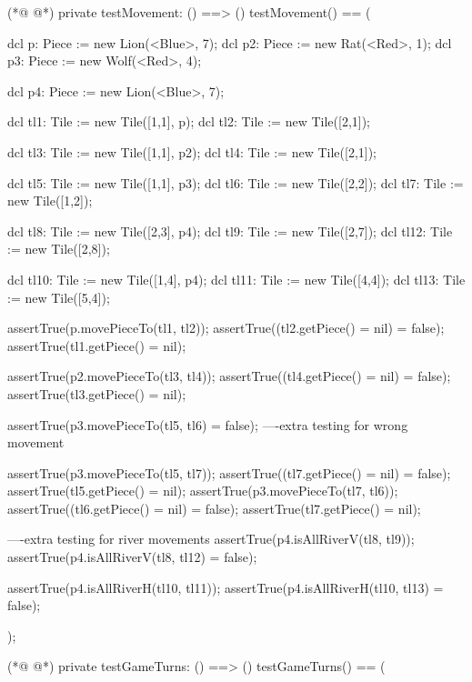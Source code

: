 \begin{vdmpp}[breaklines=true]
(*@
\label{testMovement:236}
@*)
            private testMovement: () ==> ()
         testMovement() ==
         (
         
         dcl p: Piece := new Lion(<Blue>, 7);
         dcl p2: Piece := new Rat(<Red>, 1);
         dcl p3: Piece := new Wolf(<Red>, 4);

        dcl p4: Piece := new Lion(<Blue>, 7);
         
         
         dcl tl1: Tile := new Tile([1,1], p);
         dcl tl2: Tile := new Tile([2,1]);
         
         dcl tl3: Tile := new Tile([1,1], p2);
         dcl tl4: Tile := new Tile([2,1]);
         
         dcl tl5: Tile := new Tile([1,1], p3);
         dcl tl6: Tile := new Tile([2,2]);
         dcl tl7: Tile := new Tile([1,2]);
         
         dcl tl8: Tile := new Tile([2,3], p4);
         dcl tl9: Tile := new Tile([2,7]);
         dcl tl12: Tile := new Tile([2,8]);
         
         dcl tl10: Tile := new Tile([1,4], p4);
         dcl tl11: Tile := new Tile([4,4]);
         dcl tl13: Tile := new Tile([5,4]);
         
         assertTrue(p.movePieceTo(tl1, tl2));
         assertTrue((tl2.getPiece() = nil) = false);
         assertTrue(tl1.getPiece() = nil);
         
         assertTrue(p2.movePieceTo(tl3, tl4));
         assertTrue((tl4.getPiece() = nil) = false);
         assertTrue(tl3.getPiece() = nil);
         
         assertTrue(p3.movePieceTo(tl5, tl6) = false); ----extra testing for wrong movement
         
         assertTrue(p3.movePieceTo(tl5, tl7));
         assertTrue((tl7.getPiece() = nil) = false);
         assertTrue(tl5.getPiece() = nil);
         assertTrue(p3.movePieceTo(tl7, tl6));
         assertTrue((tl6.getPiece() = nil) = false);
         assertTrue(tl7.getPiece() = nil);
         
         
         ----extra testing for river movements
         assertTrue(p4.isAllRiverV(tl8, tl9));
         assertTrue(p4.isAllRiverV(tl8, tl12) = false);
         
         assertTrue(p4.isAllRiverH(tl10, tl11));
         assertTrue(p4.isAllRiverH(tl10, tl13) = false);
         
  );
  
(*@
\label{testGameTurns:292}
@*)
              private testGameTurns: () ==> ()
         testGameTurns() ==
         (
        

\end{vdmpp}
